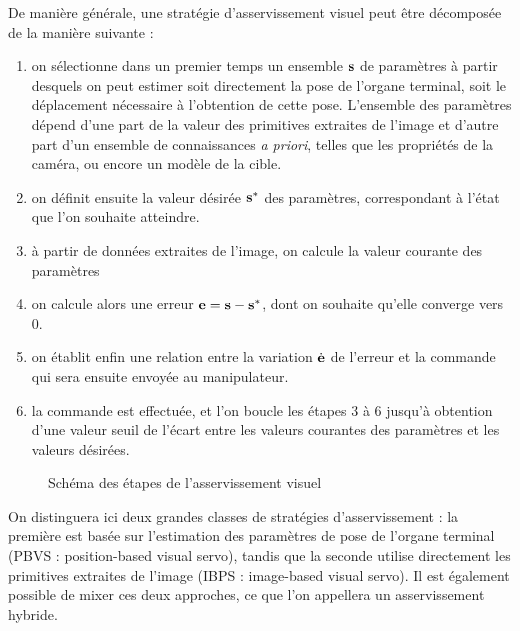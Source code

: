 De manière générale, une stratégie d'asservissement visuel peut être décomposée de la manière suivante :
\begin{enumerate}
 \item on sélectionne dans un premier temps un ensemble ${\bf s}$ de paramètres à partir desquels on peut estimer soit directement la pose de l'organe terminal, soit le déplacement nécessaire à l'obtention de cette pose. L'ensemble des paramètres dépend d'une part de la valeur des primitives extraites de l'image et d'autre part d'un ensemble de connaissances {\it a priori}, telles que les propriétés de la caméra, ou encore un modèle de la cible.
 \item on définit ensuite la valeur désirée ${\bf s}^*$ des paramètres, correspondant à l'état que l'on souhaite atteindre.
 \item à partir de données extraites de l'image, on calcule la valeur courante des paramètres
 \item on calcule alors une erreur ${\bf e} = {\bf s} - {\bf s}^*$, dont on souhaite qu'elle converge vers $0$.
 \item on établit enfin une relation entre la variation $\dot {\bf e}$ de l'erreur et la commande qui sera ensuite envoyée au manipulateur.
 \item la commande est effectuée, et l'on boucle les étapes $3$ à $6$ jusqu'à obtention d'une valeur seuil de l'écart entre les valeurs courantes des paramètres et les valeurs désirées.
\end{enumerate}

\begin{figure}[htp]
  \centering
    \def\svgwidth{.95\linewidth}
  
    \caption{\footnotesize{Schéma des étapes de l'asservissement visuel}}
\label{intro:fig13}
\end{figure}

On distinguera ici deux grandes classes de stratégies d'asservissement : la première est basée sur l'estimation des paramètres de pose de l'organe terminal (PBVS : position-based visual servo), tandis que la seconde utilise directement les primitives extraites de l'image (IBPS : image-based visual servo). Il est également possible de mixer ces deux approches, ce que l'on appellera un asservissement hybride.

